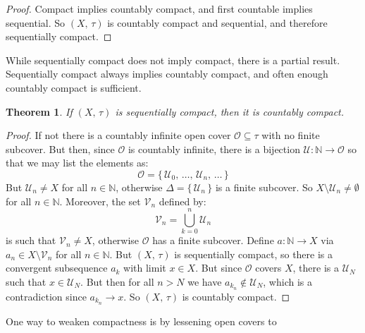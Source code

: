 \documentclass{article}
\theoremstyle{plain}
\newtheorem{theorem}{Theorem}[section]
\theoremstyle{normal}
\begin{document}
        \begin{proof}
            Compact implies countably compact, and first countable implies
            sequential. So $(X,\,\tau)$ is countably compact and sequential,
            and therefore sequentially compact.
        \end{proof}
        While sequentially compact does not imply compact, there is a partial
        result. Sequentially compact always implies countably compact, and
        often enough countably compact is sufficient.
        \begin{theorem}
            If $(X,\,\tau)$ is sequentially compact, then it is
            countably compact.
        \end{theorem}
        \begin{proof}
            If not there is a countably infinite open cover
            $\mathcal{O}\subseteq\tau$ with no finite subcover. But then,
            since $\mathcal{O}$ is countably infinite, there is a bijection
            $\mathcal{U}:\mathbb{N}\rightarrow\mathcal{O}$ so that we may
            list the elements as:
            \begin{equation}
                \mathcal{O}=
                \{\,\mathcal{U}_{0},\,\dots,\,\mathcal{U}_{n},\,\dots\,\}
            \end{equation}
            But $\mathcal{U}_{n}\ne{X}$ for all $n\in\mathbb{N}$, otherwise
            $\Delta=\{\,\mathcal{U}_{n}\,\}$ is a finite subcover. So
            $X\setminus\mathcal{U}_{n}\ne\emptyset$ for all $n\in\mathbb{N}$.
            Moreover, the set $\mathcal{V}_{n}$ defined by:
            \begin{equation}
                \mathcal{V}_{n}=\bigcup_{k=0}^{n}\mathcal{U}_{n}
            \end{equation}
            is such that $\mathcal{V}_{n}\ne{X}$, otherwise $\mathcal{O}$ has a
            finite subcover. Define $a:\mathbb{N}\rightarrow{X}$ via
            $a_{n}\in{X}\setminus\mathcal{V}_{n}$ for all $n\in\mathbb{N}$.
            But $(X,\,\tau)$ is sequentially compact, so there is a
            convergent subsequence $a_{k}$ with limit $x\in{X}$. But since
            $\mathcal{O}$ covers $X$, there is a $\mathcal{U}_{N}$ such
            that $x\in\mathcal{U}_{N}$. But then for all
            $n>N$ we have $a_{k_{n}}\not\in\mathcal{U}_{N}$, which is a
            contradiction since $a_{k_{n}}\rightarrow{x}$. So
            $(X,\,\tau)$ is countably compact.
        \end{proof}
        One way to weaken compactness is by lessening open covers to
\end{document}
